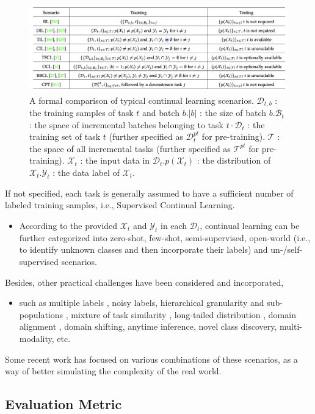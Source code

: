 \documentclass[9pt,dvipsnames]{beamer}
\begin{document}
\begin{frame}
    \begin{figure}[ht]
        \centering
        \includegraphics[width=\linewidth]{imgs/cl_2.png}
        \caption{A formal comparison of typical continual learning scenarios. $\mathcal{D}_{t, b}$ : the training samples of task $t$ and batch $b .|b|$ : the size of batch $b . \mathcal{B}_{t}$ : the space of incremental batches belonging to task $t \cdot \mathcal{D}_{t}$ : the training set of task $t$ (further specified as $\mathcal{D}_{t}^{p t}$ for pre-training). $\mathcal{T}$ : the space of all incremental tasks (further specified as $\mathcal{T}^{p t}$ for pre-training). $\mathcal{X}_{t}$ : the input data in $\mathcal{D}_{t} . p\left(\mathcal{X}_{t}\right)$ : the distribution of $\mathcal{X}_{t} . \mathcal{Y}_{t}$ : the data label of $\mathcal{X}_{t}$.}
    \end{figure}
\end{frame}
\begin{frame}
    If not specified, each task is generally assumed to have a sufficient number of labeled training samples, i.e., Supervised Continual Learning.
    \begin{itemize}
        \item According to the provided $\mathcal{X}_{t}$ and $\mathcal{Y}_{t}$ in each $\mathcal{D}_{t}$, continual learning can be further categorized into zero-shot, few-shot, semi-supervised, open-world (i.e., to identify unknown classes and then incorporate their labels)  and un-/self-supervised scenarios.
    \end{itemize}
    Besides, other practical challenges have been considered and incorporated,
    \begin{itemize}
        \item such as multiple labels , noisy labels, hierarchical granularity and sub-populations , mixture of task similarity , long-tailed distribution , domain alignment , domain shifting, anytime inference, novel class discovery, multi-modality, etc.
    \end{itemize}
    Some recent work has focused on various combinations of these scenarios, as a way of better simulating the complexity of the real world.
\end{frame}

\subsection{Evaluation Metric}
\end{document}
